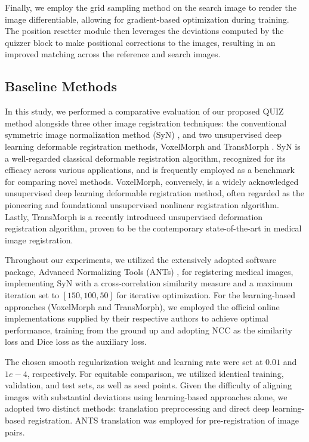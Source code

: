 \documentclass[preprint,review,12pt]{elsarticle}
\begin{document}
Finally, we employ the grid sampling method on the search image to render the image differentiable, allowing for gradient-based optimization during training. The position resetter module then leverages the deviations computed by the quizzer block to make positional corrections to the images, resulting in an improved matching across the reference and search images.

\subsection{Baseline Methods}
In this study, we performed a comparative evaluation of our proposed QUIZ method alongside three other image registration techniques: the conventional symmetric image normalization method (SyN) \cite{avants2008symmetric}, and two unsupervised deep learning deformable registration methods, VoxelMorph \cite{r14} and TransMorph \cite{t04}. SyN is a well-regarded classical deformable registration algorithm, recognized for its efficacy across various applications, and is frequently employed as a benchmark for comparing novel methods. VoxelMorph, conversely, is a widely acknowledged unsupervised deep learning deformable registration method, often regarded as the pioneering and foundational unsupervised nonlinear registration algorithm. Lastly, TransMorph is a recently introduced unsupervised deformation registration algorithm, proven to be the contemporary state-of-the-art in medical image registration.

Throughout our experiments, we utilized the extensively adopted software package, Advanced Normalizing Tools (ANTs) \cite{ants}, for registering medical images, implementing SyN with a cross-correlation similarity measure and a maximum iteration set to $[150, 100, 50]$ for iterative optimization. For the learning-based approaches (VoxelMorph and TransMorph), we employed the official online implementations supplied by their respective authors to achieve optimal performance, training from the ground up and adopting NCC as the similarity loss and Dice loss as the auxiliary loss.

The chosen smooth regularization weight and learning rate were set at $0.01$ and $1e-4$, respectively. For equitable comparison, we utilized identical training, validation, and test sets, as well as seed points. Given the difficulty of aligning images with substantial deviations using learning-based approaches alone, we adopted two distinct methods: translation preprocessing and direct deep learning-based registration. ANTS translation was employed for pre-registration of image pairs.
\end{document}
